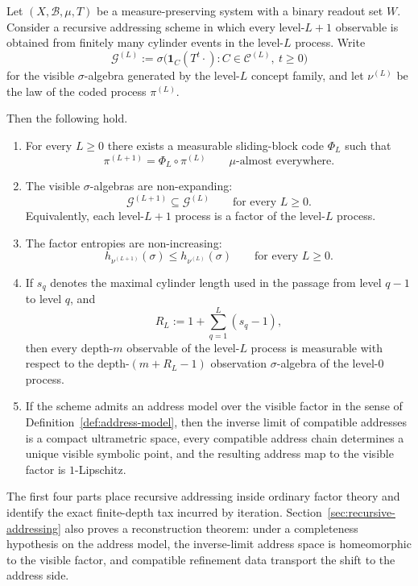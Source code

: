 \begin{theorem}\label{thm:main-structure}
Let \((X,\mathcal{B},\mu,T)\) be a measure-preserving system with a
binary readout set \(W\).  Consider a recursive addressing scheme in
which every level-\(L+1\) observable is obtained from finitely many
cylinder events in the level-\(L\) process.  Write
\[
  \mathcal{G}^{(L)}
  := \sigma\bigl(\mathbf{1}_{C}(T^t\cdot):
      C\in\mathcal{C}^{(L)},\ t\geq 0\bigr)
\]
for the visible \(\sigma\)-algebra generated by the level-\(L\) concept
family, and let \(\nu^{(L)}\) be the law of the coded process
\(\pi^{(L)}\).

Then the following hold.
\begin{enumerate}[label=(\roman*)]
  \item For every \(L\geq 0\) there exists a measurable sliding-block
    code \(\Phi_L\) such that
    \[
      \pi^{(L+1)} = \Phi_L \circ \pi^{(L)}
      \qquad \mu\text{-almost everywhere}.
    \]
  \item The visible \(\sigma\)-algebras are non-expanding:
    \[
      \mathcal{G}^{(L+1)} \subseteq \mathcal{G}^{(L)}
      \qquad\text{for every } L\geq 0.
    \]
    Equivalently, each level-\(L+1\) process is a factor of the
    level-\(L\) process.
  \item The factor entropies are non-increasing:
    \[
      h_{\nu^{(L+1)}}(\sigma) \leq h_{\nu^{(L)}}(\sigma)
      \qquad\text{for every } L\geq 0.
    \]
  \item If \(s_q\) denotes the maximal cylinder length used in the
    passage from level \(q-1\) to level \(q\), and
    \[
      R_L := 1+\sum_{q=1}^{L}(s_q-1),
    \]
    then every depth-\(m\) observable of the level-\(L\) process is
    measurable with respect to the depth-\((m+R_L-1)\) observation
    \(\sigma\)-algebra of the level-\(0\) process.
  \item If the scheme admits an address model over the visible factor in
    the sense of Definition~\ref{def:address-model}, then the inverse
    limit of compatible addresses is a compact ultrametric space, every
    compatible address chain determines a unique visible symbolic point,
    and the resulting address map to the visible factor is
    \(1\)-Lipschitz.
\end{enumerate}
\end{theorem}

The first four parts place recursive addressing inside ordinary factor
theory and identify the exact finite-depth tax incurred by iteration.
Section~\ref{sec:recursive-addressing} also proves a reconstruction
theorem: under a completeness hypothesis on the address model, the
inverse-limit address space is homeomorphic to the visible factor, and
compatible refinement data transport the shift to the address side.

